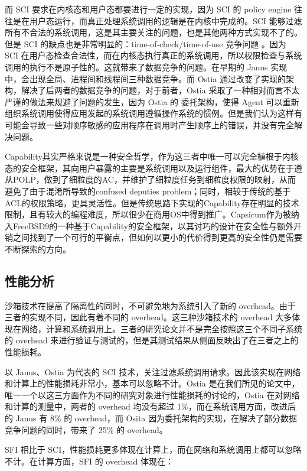 \documentclass[final,12pt]{elsarticle}
\begin{document}
而 SCI 要求在内核态和用户态都要进行一定的实现，因为 SCI 的 policy engine 往往是在用户态运行，而真正处理系统调用的逻辑是在内核中完成的。SCI 能够过滤所有不合法的系统调用，这是其主要关注的问题，也是其他两种方式实现不了的。但是 SCI 的缺点也是非常明显的：time-of-check/time-of-use 竞争问题 \cite{bishop1996checking}。因为 SCI 在用户态检查合法性，而在内核态执行真正的系统调用，所以权限检查与系统调用的执行不是原子性的。这就带来了数据竞争的问题。在早期的 Janus 实现中，会出现全局、进程间和线程间三种数据竞争。而 Ostia 通过改变了实现的架构，解决了后两者的数据竞争的问题，对于前者，Ostia 采取了一种相对而言不太严谨的做法来规避了问题的发生，因为 Ostia 的 委托架构，使得 Agent 可以重新组织系统调用使得应用发起的系统调用遵循操作系统的惯例。但是我们认为这样有可能会导致一些对顺序敏感的应用程序在调用时产生顺序上的错误，并没有完全解决问题。

Capability其实严格来说是一种安全哲学，作为这三者中唯一可以完全植根于内核态的安全框架，其向用户暴露的主要是系统调用以及运行组件，最大的优势在于遵从POLP，做到了细粒度的AC，并维护了细粒度任务到细粒度权限的映射，从而避免了由于混淆所导致的confused deputies problem；同时，相较于传统的基于ACL的权限策略，更具灵活性。但是传统思路下实现的Capability存在明显的技术限制，且有较大的编程难度，所以很少在商用OS中得到推广。Capsicum作为被纳入FreeBSD9的一种基于Capability的安全框架，以其讨巧的设计在安全性与额外开销之间找到了一个可行的平衡点，但如何以更小的代价得到更高的安全性仍是需要不断探索的方向。

\subsection{性能分析}
\label{ss: analysis}

沙箱技术在提高了隔离性的同时，不可避免地为系统引入了新的 overhead。由于三者的实现不同，因此有着不同的 overhead。这三种沙箱技术的 overhead 大多体现在网络，计算和系统调用上。三者的研究论文并不是完全按照这三个不同子系统的 overhead 来进行验证与测试的，但是其测试结果从侧面反映出了在三者之上的性能损耗。

以 Janus、Ostia 为代表的 SCI 技术，关注过滤系统调用请求。因此该实现在网络和计算上的性能损耗非常小，基本可以忽略不计。Ostia 是在我们所见的论文中，唯一一个以这三方面作为不同的研究对象进行性能损耗的讨论的，Ostia 在对网络和计算的测量中，两者的 overhead 均没有超过 1\%，而在系统调用方面，改进后的 Janus \cite{wagner1999janus} 有 8\% 的 overhead，而 Osita 因为委托架构的实现，在解决了部分数据竞争问题的同时，带来了 25\% 的 overhead。

SFI 相比于 SCI，性能损耗更多体现在计算上，而在网络和系统调用上都可以忽略不计。在计算方面，SFI 的 overhead 体现在：
\end{document}
